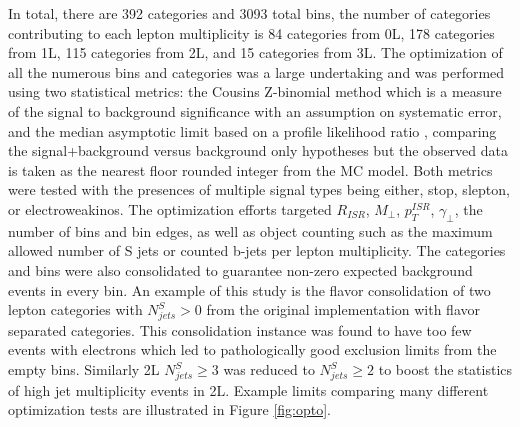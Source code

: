 In total, there are 392 categories and 3093 total bins, the number of categories contributing to each lepton multiplicity is 84 categories from 0L, 178 categories from 1L, 115 categories from 2L, and 15 categories from 3L. The optimization of all the numerous bins and categories was a large undertaking and was performed using two statistical metrics: the Cousins Z-binomial method \cite{Cousins_2008} which is a measure of the signal to background significance with an assumption on systematic error, and the median asymptotic limit based on a profile likelihood ratio \cite{Cowan:2010js}, comparing the signal+background versus background only hypotheses but the observed data is taken as the nearest floor rounded integer from the MC model. Both metrics were tested with the presences of multiple signal types being either, stop, slepton, or electroweakinos. The optimization efforts targeted $R_{ISR}$, $M_\perp$, $p_T^{ISR}$, $\gamma_\perp$, the number of bins and bin edges, as well as object counting such as the  maximum allowed number of S jets or counted b-jets per lepton multiplicity. The categories and bins were also consolidated to guarantee non-zero expected background events in every bin. An example of this study is the flavor consolidation of two lepton categories with $N_{jets}^S > 0$ from the original implementation with flavor separated categories. This consolidation instance was found to have too few events with electrons which led to pathologically good exclusion limits from the empty bins. Similarly 2L $N_{jets}^S \geq 3$  was reduced to $N_{jets}^S \geq 2$ to boost the statistics of high jet multiplicity events in 2L. Example limits comparing many different optimization tests are illustrated in Figure \ref{fig:opto}.

